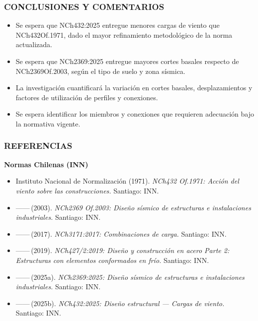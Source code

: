\documentclass[11.5pt,aspectratio=169,handout]{beamer}
\newcommand{\ctitle}[1]{\frametitle{#1}}
\begin{document}
\begin{frame}
\ctitle{CONCLUSIONES Y COMENTARIOS}
\begin{itemize}\footnotesize\setlength{\itemsep}{2.5mm}
  \item Se espera que \alert{NCh432:2025} entregue \alert{menores} cargas de
        viento que \alert{NCh432Of.1971}, dado el mayor refinamiento
        metodológico de la norma actualizada.
  \item Se espera que \alert{NCh2369:2025} entregue \alert{mayores} cortes
        basales respecto de \alert{NCh2369Of.2003}, según el tipo de suelo
        y zona sísmica.
  \item La investigación cuantificará la variación en \alert{cortes basales},
        \alert{desplazamientos} y \alert{factores de utilización} de perfiles
        y conexiones.
  \item Se espera identificar los miembros y conexiones que requieren
        adecuación bajo la normativa vigente.
\end{itemize}
\end{frame}

\nocite{*}

\begin{frame}
\ctitle{REFERENCIAS}
\vspace{-1mm}
\scriptsize\textbf{Normas Chilenas (INN)}\\[1mm]
\begin{itemize}\scriptsize\setlength{\itemsep}{0.5mm}
  \item Instituto Nacional de Normalización (1971). \textit{NCh432 Of.1971:
        Acción del viento sobre las construcciones.} Santiago: INN.
  \item ——\,(2003). \textit{NCh2369 Of.2003: Diseño sísmico de estructuras
        e instalaciones industriales.} Santiago: INN.
  \item ——\,(2017). \textit{NCh3171:2017: Combinaciones de carga.}
        Santiago: INN.
  \item ——\,(2019). \textit{NCh427/2:2019: Diseño y construcción en acero
        Parte 2: Estructuras con elementos conformados en frío.}
        Santiago: INN.
  \item ——\,(2025a). \textit{NCh2369:2025: Diseño sísmico de estructuras
        e instalaciones industriales.} Santiago: INN.
  \item ——\,(2025b). \textit{NCh432:2025: Diseño estructural — Cargas de
        viento.} Santiago: INN.
\end{itemize}
\end{frame}
\end{document}
